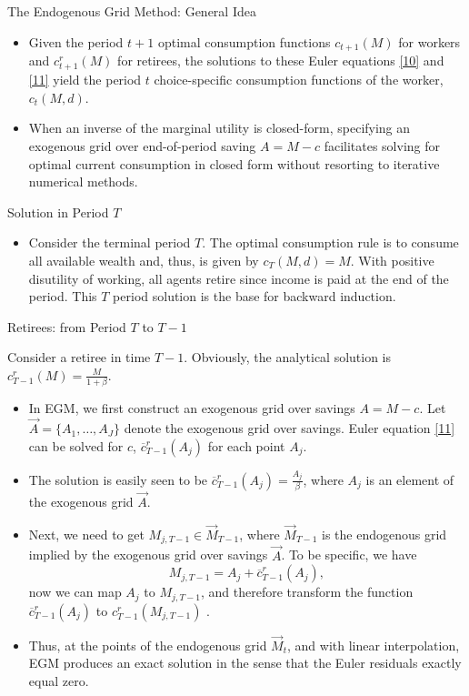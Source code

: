\documentclass[aspectratio=169]{beamer}
\begin{document}
\begin{frame}{The Endogenous Grid Method: General Idea}
	\begin{itemize}
		\item Given the period $t+1$ optimal consumption functions $c_{t+1}(M)$ for workers and $c_{t+1}^r(M)$ for retirees, the solutions to these Euler equations \ref{10} and \ref{11} yield the period $t$ choice-specific consumption functions of the worker, $c_t(M, d).$ 
		\item When an inverse of the marginal utility is closed-form, specifying an exogenous grid over end-of-period saving $A = M-c$ facilitates solving for optimal current consumption in closed form without resorting to iterative numerical methods. 
	\end{itemize}
\end{frame}

\begin{frame}{Solution in Period $T$}
	\begin{itemize}
		\item Consider the terminal period $T$. The optimal consumption rule is to consume all available wealth and, thus, is given by $c_T (M, d) = M$. With positive disutility of working, all agents retire since income is paid at the end of the period. This $T$ period solution is the base for backward induction.
			\end{itemize}
\end{frame}

\begin{frame}{Retirees: from Period $T$ to $T-1$} \small
	
	Consider a retiree in time $T-1$. Obviously, the analytical solution is $c_{T-1}^r(M) = \frac{M}{1+\beta}$. 
	\begin{itemize}
		
		\item In EGM, we first construct an exogenous grid over savings $A= M-c$. Let $\overrightarrow{A} = \{ A_1, \ldots, A_J \}$ denote the exogenous grid over savings. Euler equation \ref{11} can be solved for $c$, $\overline{c}_{T-1}^r (A_{j})$ for each point $A_j$. 
		\item The solution is easily seen to be $\overline{c}_{T-1}^r (A_{j})= \frac{A_j}{\beta}$, where $A_{j}$ is an element of the exogenous grid $\overrightarrow{A}$.
		\item Next, we need to get $M_{j, T-1} \in \overrightarrow{M}_{T-1}$, where $\overrightarrow{M}_{T-1}$ is the endogenous grid implied by the exogenous grid over savings $\overrightarrow{A}$. To be specific, we have $$M_{j, T-1} = A_j + \overline{c}_{T-1}^r(A_{j}), $$ now we can map $A_j$ to $M_{j, T-1}$, and therefore transform the function $\overline{c}_{T-1}^r (A_{j})$ to $c_{T-1}^r(M_{j, T-1})$ .
		\item Thus, at the points of the endogenous grid $\overrightarrow{M}_{t}$, and with linear interpolation, EGM produces an exact solution in the sense that the Euler residuals exactly equal zero.
	\end{itemize}
	
\end{frame}
\end{document}
